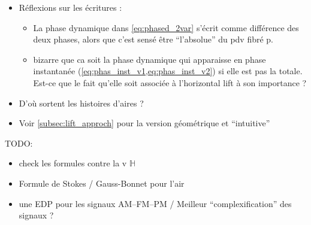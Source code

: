 \begin{itemize}
	\item Réflexions sur les écritures :
	\begin{itemize}
		\item La phase dynamique dans \eqref{eq:phased_2var} s'écrit comme différence des deux phases, alors que c'est sensé être ``l'absolue'' du pdv fibré p.
		
		\item bizarre que ca soit la phase dynamique qui apparaisse en phase instantanée (\cref{eq:phas_inst_v1,eq:phas_inst_v2}) si elle est pas la totale. Est-ce que le fait qu'elle soit associée à l'horizontal lift à son importance ?
	\end{itemize}
	
	\item D'où sortent les histoires d'aires ?
	
	\item Voir \cref{subsec:lift_approch} pour la version géométrique et ``intuitive''
\end{itemize}

TODO:
\begin{itemize}
	\item check les formules contre la v $\mathbb{H}$
	
	\item Formule de Stokes / Gauss-Bonnet pour l'air
	
	\item une EDP pour les signaux AM--FM--PM / Meilleur ``complexification'' des signaux ?
\end{itemize}

